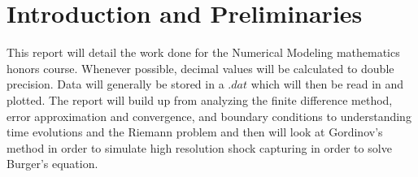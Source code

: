 \chapter{Introduction and Preliminaries}
This report will detail the work done for the Numerical Modeling mathematics honors course. Whenever possible, decimal values will be calculated to double precision. Data will generally be stored in a $.dat$ which will then be read in and plotted. The report will build up from analyzing the finite difference method, error approximation and convergence, and boundary conditions to understanding time evolutions and the Riemann problem and then will look at Gordinov's method in order to simulate high resolution shock capturing in order to solve Burger's equation.